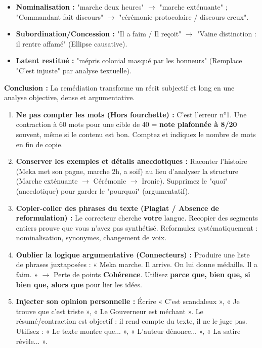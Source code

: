 \documentclass[11pt]{article}
\newcommand{\cle}[1]{{\popxbold\color{popdark}#1}}
\begin{document}
\begin{exoresolu}
\begin{enumerate}
\begin{itemize}
                \item \textbf{Nominalisation :} "marche deux heures" $\rightarrow$ "marche exténuante" ; "Commandant fait discours" $\rightarrow$ "cérémonie protocolaire / discours creux".
                \item \textbf{Subordination/Concession :} "Il a faim / Il reçoit" $\rightarrow$ "Vaine distinction : il rentre affamé" (Ellipse causative).
                \item \textbf{Latent restitué :} "mépris colonial masqué par les honneurs" (Remplace "C'est injuste" par analyse textuelle).
            \end{itemize}
    \end{enumerate}
    \textbf{Conclusion :} La remédiation transforme un récit subjectif et long en une analyse objective, dense et argumentative.
\end{exoresolu}

\begin{attention}
    \begin{enumerate}
        \item \textbf{Ne pas compter les mots (Hors fourchette) :} C'est l'erreur n°1. Une contraction à 60 mots pour une cible de 40 = \textbf{note plafonnée à 8/20} souvent, même si le contenu est bon. \cle{Comptez et indiquez le nombre de mots en fin de copie.}
        \item \textbf{Conserver les exemples et détails anecdotiques :} Raconter l'histoire (Meka met son pagne, marche 2h, a soif) au lieu d'analyser la structure (Marche exténuante $\rightarrow$ Cérémonie $\rightarrow$ Ironie). \cle{Supprimez le "quoi" (anecdotique) pour garder le "pourquoi" (argumentatif).}
        \item \textbf{Copier-coller des phrases du texte (Plagiat / Absence de reformulation) :} Le correcteur cherche \textbf{votre} langue. Recopier des segments entiers prouve que vous n'avez pas synthétisé. \cle{Reformulez systématiquement : nominalisation, synonymes, changement de voix.}
        \item \textbf{Oublier la logique argumentative (Connecteurs) :} Produire une liste de phrases juxtaposées : « Meka marche. Il arrive. On lui donne médaille. Il a faim. » $\rightarrow$ Perte de points \textbf{Cohérence}. \cle{Utilisez \textbf{parce que, bien que, si bien que, alors que} pour lier les idées.}
        \item \textbf{Injecter son opinion personnelle :} Écrire « C'est scandaleux », « Je trouve que c'est triste », « Le Gouverneur est méchant ». \cle{Le résumé/contraction est objectif : il rend compte du texte, il ne le juge pas.} Utilisez : « Le texte montre que... », « L'auteur dénonce... », « La satire révèle... ».
    \end{enumerate}
\end{attention}
\end{document}
